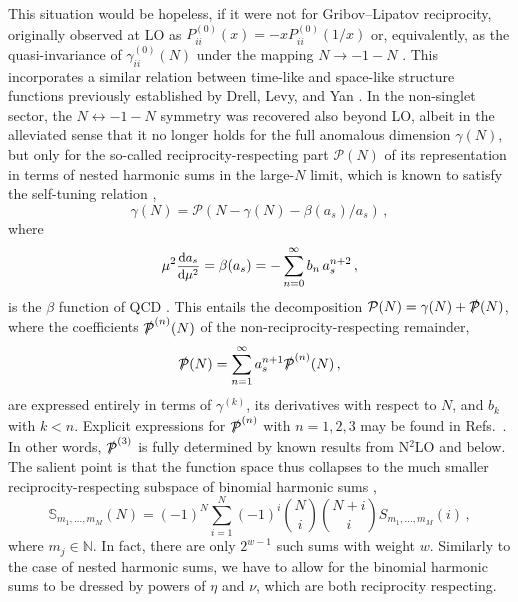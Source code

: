 \documentclass[
 twocolumn,
 superscriptaddress,
 preprintnumbers,
 nofootinbib,
 amsmath,amssymb,
 aps,
 prl
 ]{revtex4-2}
\newcommand{\NP}{\slashed{\mathcal{P}}}
\newcommand{\BS}{\mathbb{S}}
\def\frct#1#2{\mbox{\small{$\displaystyle\frac{#1}{#2}$}}}
\begin{document}
This situation would be hopeless, if it were not for Gribov--Lipatov reciprocity, originally observed at LO as $P_{ii}^{(0)}(x)=-xP_{ii}^{(0)}(1/x)$ or, equivalently, as the quasi-invariance of $\gamma_{ii}^{(0)}(N)$ under the mapping $N\to-1-N$ \cite{Gribov:1972rt}.
This incorporates a similar relation between time-like and space-like structure functions previously established by Drell, Levy, and Yan \cite{Drell:1969jm,Blumlein:2000wh}.
In the non-singlet sector, the $N\leftrightarrow-1-N$ symmetry was recovered also beyond LO, albeit in the alleviated sense that it no longer holds for the full anomalous dimension $\gamma(N)$, but only for the so-called reciprocity-respecting part $\mathcal{P}(N)$ of its representation in terms of nested harmonic sums in the large-$N$ limit, which is known to satisfy the self-tuning relation \cite{Dokshitzer:2005bf,Dokshitzer:2006nm,Basso:2006nk},
\begin{equation}
\gamma(N)=\mathcal{P}(N-\gamma(N)-\beta(a_s)/a_s)\,,
\label{eq:self}
\end{equation}
where
\begin{equation}
\mu^2\frct{\mathrm{d}a_s}{\mathrm{d}\mu^2}=
\beta(a_s)=-\sum_{n=0}^\infty b_n\,a_s^{n+2}\,,
\end{equation}
is the $\beta$ function of QCD \cite{Gross:1973id,Politzer:1973fx,Jones:1974mm,Caswell:1974gg,Tarasov:1980au,Larin:1993tp,vanRitbergen:1997va,Chetyrkin:2004mf,Czakon:2004bu,Luthe:2016ima,Baikov:2016tgj,Herzog:2017ohr,Luthe:2017ttg}.
This entails the decomposition $\mathcal{P}(N)=\gamma(N)+\NP(N)$, where the coefficients $\NP^{(n)}(N)$ of the non-reciprocity-respecting remainder,
\begin{equation}
  \NP(N)=\sum_{n=1}^\infty a_s^{n+1}\NP^{(n)}(N)\,,
\end{equation}
are expressed entirely in terms of $\gamma^{(k)}$, its derivatives with respect to $N$, and $b_k$ with $k<n$.
Explicit expressions for $\NP^{(n)}$ with $n=1,2,3$ may be found in Refs.~\cite{Kniehl:2025jfs,Kniehl:2026axe}.
In other words, $\NP^{(3)}$ is fully determined by known results from N${}^2$LO and below.
The salient point is that the function space thus collapses to the much smaller reciprocity-respecting subspace of binomial harmonic sums \cite{Vermaseren:1998uu},
\begin{equation}
\BS_{m_1,\ldots,m_M}\!(N)\!=\!(-1)^N\!\sum_{i=1}^{N}\!(-1)^i\!\binom{N}{i}\!\!\binom{N+i}{i}\!S_{m_1,...,m_M}(i)\,,
\end{equation}
where $m_j\in\mathbb{N}$.
In fact, there are only $2^{w-1}$ such sums with weight $w$.
Similarly to the case of nested harmonic sums, we have to allow for the binomial harmonic sums to be dressed by powers of $\eta$ and $\nu$, which are both reciprocity respecting.
\end{document}
